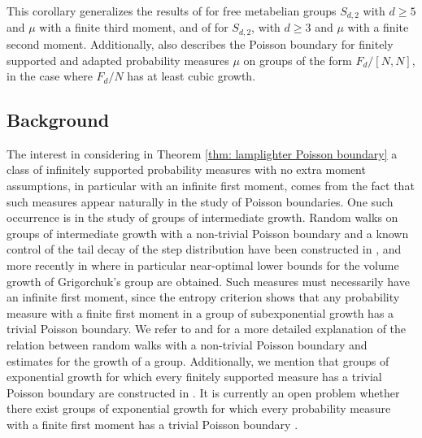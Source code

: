 \documentclass[reqno,oneside,11pt]{amsart}
\theoremstyle{plain}
\theoremstyle{definition}
\begin{document}
This corollary generalizes the results of \cite[Theorem 2]{Erschler2011} for free metabelian groups $S_{d,2}$ with $d\ge 5$ and $\mu$ with a finite third moment, and of \cite[Section 6]{LyonsPeres2021} for $S_{d,2}$, with $d\ge 3$ and $\mu$ with a finite second moment. Additionally, \cite[Section 6]{LyonsPeres2021} also describes the Poisson boundary for finitely supported and adapted probability measures $\mu$ on groups of the form $F_d/[N,N]$, in the case where $F_d/N$ has at least cubic growth.
 
\subsection{Background}\label{subsection: background}
The interest in considering in Theorem \ref{thm: lamplighter Poisson boundary} a class of infinitely supported probability measures with no extra moment assumptions, in particular with an infinite first moment, comes from the fact that such measures appear naturally in the study of Poisson boundaries. One such occurrence is in the study of groups of intermediate growth. Random walks on groups of intermediate growth with a non-trivial Poisson boundary and a known control of the tail decay of the step distribution have been constructed in \cite[Theorem 2]{Erschler2004}, and more recently in \cite[Theorems A, B and C]{ErschlerZheng2020} where in particular near-optimal lower bounds for the volume growth of Grigorchuk's group are obtained. Such measures must necessarily have an infinite first moment, since the entropy criterion shows that any probability measure with a finite first moment in a group of subexponential growth has a trivial Poisson boundary.  We refer to \cite[Section 2.1]{ErschlerZheng2020} and \cite[Section 2]{Zheng2022} for a more detailed explanation of the relation between random walks with a non-trivial Poisson boundary and estimates for the growth of a group. Additionally, we mention that groups of exponential growth for which every finitely supported measure has a trivial Poisson boundary are constructed in \cite[Theorem A]{BartholdiErschler2017}. It is currently an open problem whether there exist groups of exponential growth for which every probability measure with a finite first moment has a trivial Poisson boundary \cite[Question 1.1]{BartholdiErschler2017}.
\end{document}
